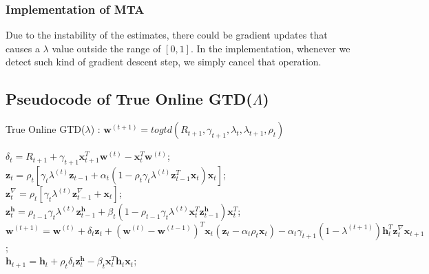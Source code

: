 \subsubsection{Implementation of MTA}
Due to the instability of the estimates, there could be gradient updates that causes a $\lambda$ value outside the range of $[0, 1]$. In the implementation, whenever we detect such kind of gradient descent step, we simply cancel that operation.

\subsection{Pseudocode of True Online GTD($\Lambda$)}
\begin{algorithm}
\label{alg:true_online_GTD_Lambda}
\caption{True Online GTD($\lambda$) \cite{hasselt2014true}: $\bm{w}^{(t+1)} = togtd(R_{t+1}, \gamma_{t+1},\lambda_{t},\lambda_{t+1},\rho_t)$}
$\delta_t = R_{t+1} + \gamma_{t+1} \bm{x}_{t+1}^T \bm{w}^{(t)} - \bm{x}_{t}^T \bm{w}^{(t)}$;\\
$\bm{z}_t = \rho_t \left[\gamma_t \lambda^{(t)} \bm{z}_{t-1} + \alpha_t (1 - \rho_t \gamma_t \lambda^{(t)} \bm{z}_{t-1}^T\bm{x}_{t}) \bm{x}_{t} \right]$;\\
$\bm{z}_t^\nabla = \rho_t \left[ \gamma_t \lambda^{(t)} \bm{z}_{t-1}^\nabla + \bm{x}_{t} \right]$;\\
$\bm{z}_t^{\bm{h}} = \rho_{t-1} \gamma_t \lambda^{(t)} \bm{z}_{t-1}^{\bm{h}} + \beta_t (1 - \rho_{t-1} \gamma_t \lambda^{(t)} \bm{x}_{t}^T \bm{z}_{t-1}^{\bm{h}})\bm{x}_{t}^T$;\\
$\bm{w}^{(t+1)} = \bm{w}^{(t)} + \delta_t \bm{z}_t + (\bm{w}^{(t)} - \bm{w}^{(t-1)})^T \bm{x}_t(\bm{z}_t - \alpha_t \rho_t \bm{x}_t) - \alpha_t \gamma_{t+1}(1-\lambda^{(t+1)})\bm{h}_t^T \bm{z}_t^\nabla \bm{x}_{t+1}$;\\
$\bm{h}_{t+1} = \bm{h}_{t} + \rho_t \delta_t \bm{z}_t^{\bm{h}} - \beta_t \bm{x}_t^T\bm{h}_{t}\bm{x}_t$;\\
\end{algorithm}
